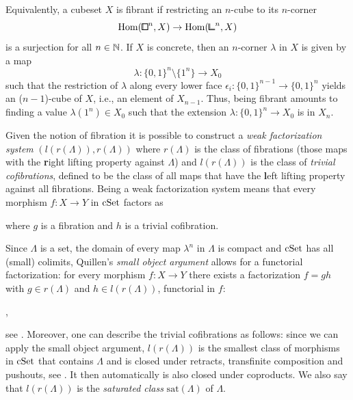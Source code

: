 \begin{remark}
Equivalently, a cubeset $X$ is fibrant if restricting an $n$-cube to its $n$-corner
\[
    \hom({\bbox}^n,X)\to\hom({\bbcor}^n,X)
\]
is a surjection for all $n\in{\mathbb{N}}$.
If $X$ is concrete, then an $n$-corner $\lambda$ in $X$ is given by a map
\[
    \lambda\colon\{0,1\}^n\setminus\{1^n\}\to X_0
\]
such that the restriction of $\lambda$ along every lower face
$\epsilon_i\colon \{0,1\}^{n-1}\to\{0,1\}^n$ yields an ($n-1$)-cube of $X$,
i.e., an element of $X_{n-1}$.
Thus, being fibrant amounts to finding a value $\lambda(1^n)\in X_0$
such that the extension $\lambda\colon\{0,1\}^n\to X_0$ is in $X_n$.
\end{remark}

Given the notion of fibration it is possible to construct a \emph{weak factorization system}
$(l(r(\Lambda)),r(\Lambda))$ where $r(\Lambda)$ is the class of fibrations
(those maps with the {\textbf{r}ight lifting property} against $\Lambda$)
and $l(r(\Lambda))$ is the class of \emph{trivial cofibrations},
defined to be the class of all maps that have the {\textbf{l}eft lifting property} against all fibrations.
Being a weak factorization system means that every morphism $f\colon X\to Y$ in $\mathrm{cSet}$ factors as
\begin{center}
\end{center}
where $g$ is a fibration and $h$ is a trivial cofibration.

Since $\Lambda$ is a set, the domain of every map $\lambda^n$ in $\Lambda$ is compact and $\mathrm{cSet}$ has all (small) colimits,
Quillen's \emph{small object argument} allows for a functorial factorization:
for every morphism $f\colon X\to Y$ there exists a factorization $f=gh$ with $g\in r(\Lambda)$
and $h\in l(r(\Lambda))$, functorial in $f$:
\begin{center}
,
\end{center}
see \cite[Theorem 12.2.2, Theorem 12.5.1]{Riehl}.
Moreover, one can describe the trivial cofibrations as follows:
since we can apply the small object argument, $l(r(\Lambda))$ is the smallest class of morphisms in $\mathrm{cSet}$
that contains $\Lambda$ and is closed under retracts, transfinite composition and pushouts,
see \cite[Proposition 2.1.9]{Cisinski2025}.
It then automatically is also closed under coproducts.
We also say that $l(r(\Lambda))$ is the \emph{saturated class} $\mathrm{sat}(\Lambda)$ of $\Lambda$.

